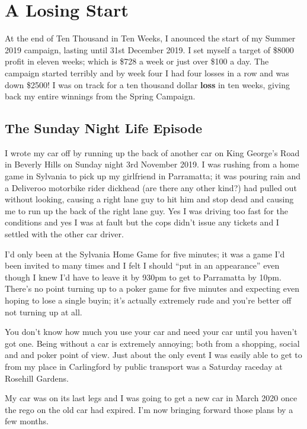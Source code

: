\chapter{A Losing Start}

At the end of Ten Thousand in Ten Weeks, I anounced the start of my
Summer 2019 campaign, lasting until 31st December 2019. I set myself a
target of \$8000 profit in eleven weeks; which is \$728 a week or just
over \$100 a day. The campaign started terribly and by week four I had
four losses in a row and was down \$2500! I was on track for a ten
thousand dollar \textbf{loss} in ten weeks, giving back my entire
winnings from the Spring Campaign.


\section*{The Sunday Night Life Episode}

I wrote my car off by running up the back of another car on King
George's Road in Beverly Hills on Sunday night 3rd November 2019.
I was rushing from a home game in Sylvania to pick up my girlfriend in
Parramatta; it was pouring rain and a Deliveroo motorbike
rider dickhead (are there any other kind?) had pulled out without
looking, causing a right lane guy to hit him and stop dead and causing
me to run up the back of the right lane guy. Yes I was driving too
fast for the conditions and yes I was at fault but the cops didn't
issue any tickets and I settled with the other car driver.

I'd only been at the Sylvania Home Game for five minutes; it was a
game I'd been invited to many times and I felt I should ``put in an
appearance'' even though I knew I'd have to leave it by 930pm to get
to Parramatta by 10pm. There's no point turning up to a poker game for
five minutes and expecting even hoping to lose a single buyin; it's
actually extremely rude and you're better off not turning up at all.

You don't know how much you use your car and need your car until you
haven't got one. Being without a car is extremely annoying; both from
a shopping, social and and poker point of view. Just about the only
event I was easily able to get to from my place in Carlingford by
public transport was a Saturday raceday at Rosehill Gardens.

My car was on its last legs and I was going to get a new car in March
2020 once the rego on the old car had expired. I'm now bringing
forward those plans by a few months.
